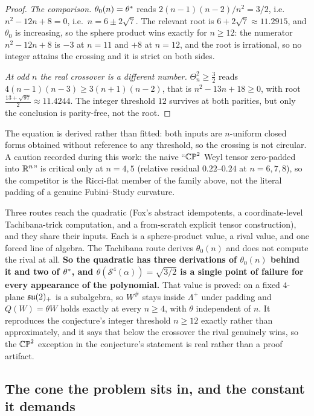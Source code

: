 \begin{proof}
\emph{The comparison.} $\theta_0(n)=\theta^{*}$ reads $2(n-1)(n-2)/n^2=3/2$, i.e.\ $n^2-12n+8=0$, i.e.\ $n=6\pm2\sqrt7$. The relevant root is $6+2\sqrt7\approx11.2915$, and $\theta_0$ is increasing, so the sphere product wins exactly for $n\ge12$: the numerator $n^2-12n+8$ is $-3$ at $n=11$ and $+8$ at $n=12$, and the root is irrational, so no integer attains the crossing and it is strict on both sides.

\emph{At odd $n$ the real crossover is a different number.} $\Theta_n^2\ge\tfrac32$ reads $4(n-1)(n-3)\ge3(n+1)(n-2)$, that is $n^2-13n+18\ge0$, with root $\tfrac{13+\sqrt{97}}2\approx11.4244$. The integer threshold $12$ survives at both parities, but only the conclusion is parity-free, not the root.
\end{proof}

The equation is derived rather than fitted: both inputs are $n$-uniform closed forms obtained without reference to any threshold, so the crossing is not circular. A caution recorded during this work: the naive ``$\mathbb{CP}^2$ Weyl tensor zero-padded into $\mathbb{R}^n$'' is critical only at $n=4,5$ (relative residual $0.22$--$0.24$ at $n=6,7,8$), so the competitor is the Ricci-flat member of the family above, not the literal padding of a genuine Fubini--Study curvature.

Three routes reach the quadratic (Fox's abstract idempotents, a coordinate-level Tachibana-trick computation, and a from-scratch explicit tensor construction), and they share their inputs. Each is a sphere-product value, a rival value, and one forced line of algebra. The Tachibana route derives $\theta_0(n)$ and does not compute the rival at all. \textbf{So the quadratic has three derivations of $\theta_0(n)$ behind it and two of $\theta^{*}$, and $\theta(\mathcal S^4(\alpha))=\sqrt{3/2}$ is a single point of failure for every appearance of the polynomial.} That value is proved: on a fixed $4$-plane $\mathfrak{su}(2)_+$ is a subalgebra, so $W^{\#}$ stays inside $\Lambda^+$ under padding and $Q(W)=\theta W$ holds exactly at every $n\ge4$, with $\theta$ independent of $n$. It reproduces the conjecture's integer threshold $n\ge12$ exactly rather than approximately, and it says that below the crossover the rival genuinely wins, so the $\mathbb{CP}^2$ exception in the conjecture's statement is real rather than a proof artifact.

\subsection{The cone the problem sits in, and the constant it demands}\label{sec:cone}


